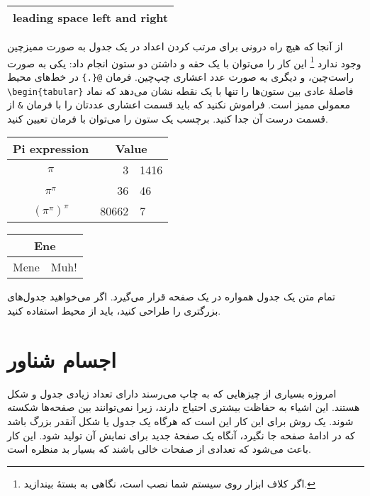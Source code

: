 \begin{example}
\begin{tabular}{l}
\hline
leading space left and right\\
\hline
\end{tabular}
\end{example}

%
%

از آنجا که هیچ راه درونی برای مرتب کردن اعداد در یک جدول به صورت ممیزچین وجود ندارد
\footnote{اگر کلاف ابزار روی سیستم شما نصب است، نگاهی به بستهٔ
 بیندازید.}
این کار را می‌توان با یک حقه و داشتن دو ستون انجام داد: یکی به صورت راست‌چین، و دیگری به صورت عدد اعشاری  چپ‌چین. فرمان 
\verb|@{.}|
در  خط‌های محیط 
\verb|\begin{tabular}|
فاصلهٔ عادی بین ستون‌ها را تنها با یک نقطه نشان می‌دهد که نماد معمولی ممیز است. فراموش نکنید که باید قسمت اعشاری عددتان را با فرمان 
\verb|&|
از قسمت درست آن جدا کنید. برچسب یک ستون را می‌توان با فرمان 
تعیین کنید.
 
\begin{example}
\begin{tabular}{c r @{.} l}
Pi expression       &
\multicolumn{2}{c}{Value} \\
\hline
$\pi$               & 3&1416  \\
$\pi^{\pi}$         & 36&46   \\
$(\pi^{\pi})^{\pi}$ & 80662&7 \\
\end{tabular}
\end{example}

\begin{example}
\begin{tabular}{|c|c|}
\hline
\multicolumn{2}{|c|}{Ene} \\
\hline
Mene & Muh! \\
\hline
\end{tabular}
\end{example}

تمام متن یک جدول همواره در یک صفحه قرار می‌گیرد. اگر می‌خواهید جدول‌های بزرگتری را طراحی کنید، باید از محیط 
استفاده کنید.
\section{اجسام شناور}
امروزه بسیاری از چیز‌هایی که به چاپ می‌رسند دارای تعداد زیادی جدول و شکل هستند. این اشیاء به حفاظت بیشتری احتیاج دارند، زیرا نمی‌توانند بین صفحه‌ها شکسته شوند. یک روش برای این کار این است که هرگاه یک جدول یا شکل آنقدر بزرگ باشد که در ادامهٔ صفحه جا نگیرد، آنگاه یک صفحهٔ جدید برای نمایش آن تولید شود. این کار باعث می‌شود که تعدادی از صفحات خالی باشند که بسیار بد منظره است.

